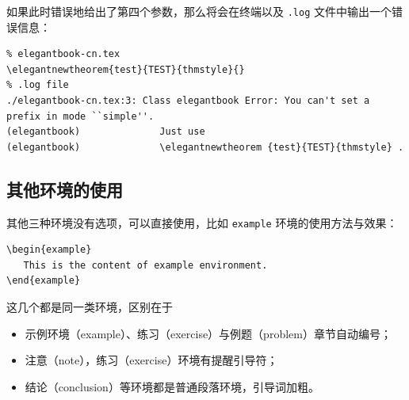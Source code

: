 \documentclass[lang=cn,10pt,scheme=chinese]{boyogalaelegantbook}
\begin{document}
\begin{itemize}
  如果此时错误地给出了第四个参数，那么将会在终端以及 \verb|.log| 文件中输出一个错误信息：
\begin{lstlisting}
% elegantbook-cn.tex
\elegantnewtheorem{test}{TEST}{thmstyle}{}
% .log file
./elegantbook-cn.tex:3: Class elegantbook Error: You can't set a prefix in mode ``simple''.
(elegantbook)              Just use 
(elegantbook)              \elegantnewtheorem {test}{TEST}{thmstyle} .
\end{lstlisting}

\end{itemize}

\subsection{其他环境的使用}

其他三种环境没有选项，可以直接使用，比如 \lstinline{example} 环境的使用方法与效果：
\begin{lstlisting}
\begin{example}
   This is the content of example environment.
\end{example}
\end{lstlisting}

这几个都是同一类环境，区别在于

\begin{itemize}
  \item 示例环境（example）、练习（exercise）与例题（problem）章节自动编号；
  \item 注意（note），练习（exercise）环境有提醒引导符；
  \item 结论（conclusion）等环境都是普通段落环境，引导词加粗。
\end{itemize}

\end{document}
